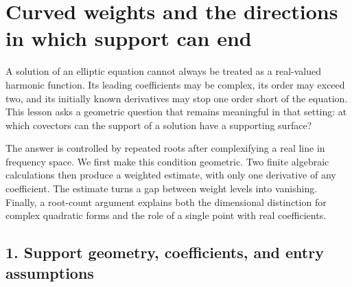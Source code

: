 \documentclass[
  11pt,
]{article}
\author{}
\date{}
\makeatletter
\let\ReaderOriginalAnchorStart\hyper@anchorstart
\let\ReaderOriginalAnchorEnd\hyper@anchorend
\let\ReaderPendingAliases\@empty
\def\ReaderArmAliases#1{\gdef\ReaderPendingAliases{#1}}
\def\hyper@anchorstart#1{\ReaderIfNativeAnchorTF{#1}{\ReaderPendingAliases\global\let\ReaderPendingAliases\@empty}{}\ReaderOriginalAnchorStart{#1}}
\makeatother
\begin{document}
\ReaderArmAliases{\ReaderOriginalAnchorStart{curved-weights-and-the-directions-in-which-support-can-end}\ReaderOriginalAnchorEnd}
\section{Curved weights and the directions in which support can
end}\label{curved-weights-and-the-directions-in-which-support-can-end}

A solution of an elliptic equation cannot always be treated as a
real-valued harmonic function. Its leading coefficients may be complex,
its order may exceed two, and its initially known derivatives may stop
one order short of the equation. This lesson asks a geometric question
that remains meaningful in that setting: at which covectors can the
support of a solution have a supporting surface?

The answer is controlled by repeated roots after complexifying a real
line in frequency space. We first make this condition geometric. Two
finite algebraic calculations then produce a weighted estimate, with
only one derivative of any coefficient. The estimate turns a gap between
weight levels into vanishing. Finally, a root-count argument explains
both the dimensional distinction for complex quadratic forms and the
role of a single point with real coefficients.

\ReaderArmAliases{\ReaderOriginalAnchorStart{AN03-SUC-001}\ReaderOriginalAnchorEnd\begingroup\expandafter\def\csname @currentHref\endcsname{AN03-SUC-001}\label{AN03-SUC-001}\endgroup\ReaderOriginalAnchorStart{an03-suc-001-support-geometry-coefficients-and-entry-assumptions}\ReaderOriginalAnchorEnd\begingroup\expandafter\def\csname @currentHref\endcsname{an03-suc-001-support-geometry-coefficients-and-entry-assumptions}\label{an03-suc-001-support-geometry-coefficients-and-entry-assumptions}\endgroup\ReaderOriginalAnchorStart{1-support-geometry-coefficients-and-entry-assumptions}\ReaderOriginalAnchorEnd\begingroup\expandafter\def\csname @currentHref\endcsname{1-support-geometry-coefficients-and-entry-assumptions}\label{1-support-geometry-coefficients-and-entry-assumptions}\endgroup\ReaderOriginalAnchorStart{support-geometry-coefficients-and-entry-assumptions}\ReaderOriginalAnchorEnd}
\subsection{1. Support geometry, coefficients, and entry
assumptions}\label{support-geometry-coefficients-and-entry-assumptions}
\end{document}
